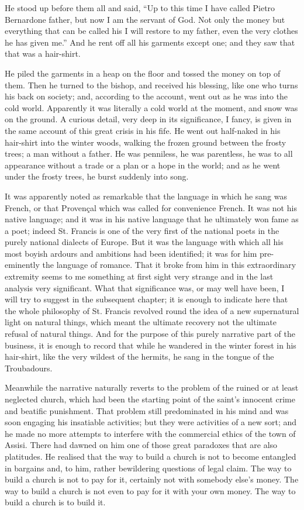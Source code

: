 \documentclass{book}
\begin{document}
He stood up before them all and said, “Up to this time I have called Pietro Bernardone father, but now I am the servant of God. Not only the money but everything that can be called his I will restore to my father, even the very clothes he has given me.” And he rent off all his garments except one; and they saw that that was a hair-shirt.

He piled the garments in a heap on the floor and tossed the money on top of them. Then he turned to the bishop, and received his blessing, like one who turns his back on society; and, according to the account, went out as he was into the cold world. Apparently it was literally a cold world at the moment, and snow was on the ground. A curious detail, very deep in its significance, I fancy, is given in the same account of this great crisis in his fife. He went out half-naked in his hair-shirt into the winter woods, walking the frozen ground between the frosty trees; a man without a father. He was penniless, he was parentless, he was to all appearance without a trade or a plan or a hope in the world; and as he went under the frosty trees, he burst suddenly into song.

It was apparently noted as remarkable that the language in which he sang was French, or that Provençal which was called for convenience French. It was not his native language; and it was in his native language that he ultimately won fame as a poet; indeed St. Francis is one of the very first of the national poets in the purely national dialects of Europe. But it was the language with which all his most boyish ardours and ambitions had been identified; it was for him pre-eminently the language of romance. That it broke from him in this extraordinary extremity seems to me something at first sight very strange and in the last analysis very significant. What that significance was, or may well have been, I will try to suggest in the subsequent chapter; it is enough to indicate here that the whole philosophy of St. Francis revolved round the idea of a new supernatural light on natural things, which meant the ultimate recovery not the ultimate refusal of natural things. And for the purpose of this purely narrative part of the business, it is enough to record that while he wandered in the winter forest in his hair-shirt, like the very wildest of the hermits, he sang in the tongue of the Troubadours.

Meanwhile the narrative naturally reverts to the problem of the ruined or at least neglected church, which had been the starting point of the saint’s innocent crime and beatific punishment. That problem still predominated in his mind and was soon engaging his insatiable activities; but they were activities of a new sort; and he made no more attempts to interfere with the commercial ethics of the town of Assisi. There had dawned on him one of those great paradoxes that are also platitudes. He realised that the way to build a church is not to become entangled in bargains and, to him, rather bewildering questions of legal claim. The way to build a church is not to pay for it, certainly not with somebody else’s money. The way to build a church is not even to pay for it with your own money. The way to build a church is to build it.
\end{document}
